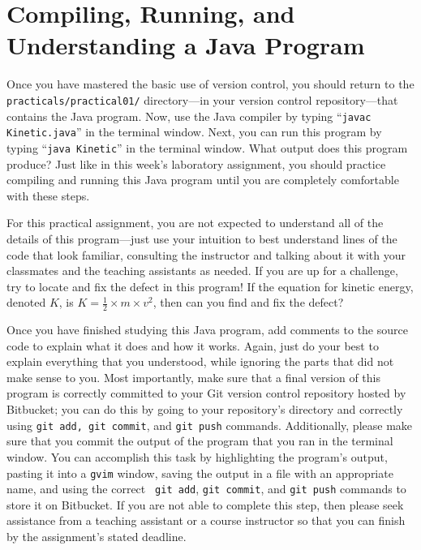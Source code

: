 
\vspace*{-.05in}
\section*{Compiling, Running, and Understanding a Java Program}

Once you have mastered the basic use of version control, you should return to the \\ {\tt practicals/practical01/}
directory---in your version control repository---that contains the Java program. Now, use the Java compiler by typing
``{\tt javac Kinetic.java}'' in the terminal window.  Next, you can run this program by typing ``{\tt java Kinetic}'' in
the terminal window.  What output does this program produce?  Just like in this week's laboratory assignment, you should
practice compiling and running this Java program until you are completely comfortable with these steps.

For this practical assignment, you are not expected to understand all of the details of this program---just use your
intuition to best understand lines of the code that look familiar, consulting the instructor and talking about it with
your classmates and the teaching assistants as needed. If you are up for a challenge, try to locate and fix the defect
in this program! If the equation for kinetic energy, denoted $K$, is $K=\frac{1}{2} \times m \times v^2$, then can you
find and fix the defect?

Once you have finished studying this Java program, add comments to the source code to explain what it does and how it
works.  Again, just do your best to explain everything that you understood, while ignoring the parts that did not make
sense to you.  Most importantly, make sure that a final version of this program is correctly committed to your Git
version control repository hosted by Bitbucket; you can do this by going to your repository's directory and correctly
using {\tt git add, git commit}, and {\tt git push} commands. Additionally, please make sure that you commit the output
of the program that you ran in the terminal window.  You can accomplish this task by highlighting the program's output,
pasting it into a {\tt gvim} window, saving the output in a file with an appropriate name, and using the correct {\tt
git add}, {\tt git commit}, and {\tt git push} commands to store it on Bitbucket.  If you are not able to complete this
step, then please seek assistance from a teaching assistant or a course instructor so that you can finish by the
assignment's stated deadline.

